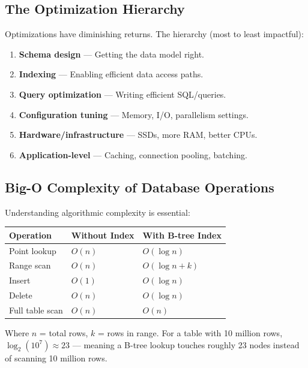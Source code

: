 \documentclass[12pt,a4paper]{article}
\begin{document}
\subsection{The Optimization Hierarchy}

Optimizations have diminishing returns. The hierarchy (most to least impactful):

\begin{enumerate}
    \item \textbf{Schema design} --- Getting the data model right.
    \item \textbf{Indexing} --- Enabling efficient data access paths.
    \item \textbf{Query optimization} --- Writing efficient SQL/queries.
    \item \textbf{Configuration tuning} --- Memory, I/O, parallelism settings.
    \item \textbf{Hardware/infrastructure} --- SSDs, more RAM, better CPUs.
    \item \textbf{Application-level} --- Caching, connection pooling, batching.
\end{enumerate}

\subsection{Big-O Complexity of Database Operations}

Understanding algorithmic complexity is essential:

\begin{center}
\begin{tabular}{lll}
\toprule
\textbf{Operation} & \textbf{Without Index} & \textbf{With B-tree Index} \\
\midrule
Point lookup & $O(n)$ & $O(\log n)$ \\
Range scan & $O(n)$ & $O(\log n + k)$ \\
Insert & $O(1)$ & $O(\log n)$ \\
Delete & $O(n)$ & $O(\log n)$ \\
Full table scan & $O(n)$ & $O(n)$ \\
\bottomrule
\end{tabular}
\end{center}

Where $n$ = total rows, $k$ = rows in range. For a table with 10 million rows, $\log_2(10^7) \approx 23$ --- meaning a B-tree lookup touches roughly 23 nodes instead of scanning 10 million rows.


\end{document}
